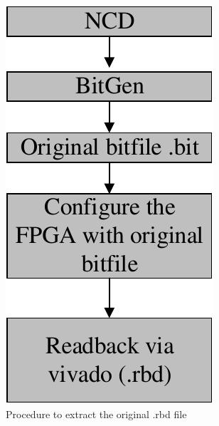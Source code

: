 \begin{figure}[tb!]
 \centering
  \captionsetup{justification=centering}    
   \includegraphics[scale = 0.5]{Figures/original-rbd.pdf}
   \caption{Procedure to extract the original .rbd file}
\label{fig:original-rbd}
\end{figure}
